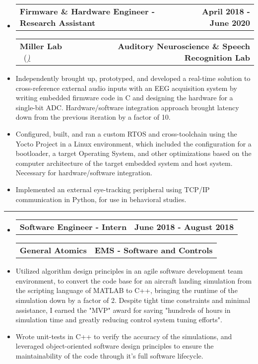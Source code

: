 \documentclass[10pt,letterpaper]{article}
\makeatletter
\newcommand{\header}[2]
{
	\begin{tabular*}{\linewidth}{l @{\extracolsep{\fill}} r}
		\hspace{-27pt} #1 & #2 \\
	\end{tabular*}
}
\makeatother
\begin{document}
\begin{itemize}
	\item[]
		\header
			{\textbf{Firmware \& Hardware Engineer - Research Assistant}} 
			{\textbf{April 2018 - June 2020}}
		\header
		{\textbf{Miller Lab} \ (\href{https://millerlab.faculty.ucdavis.edu}{\small \emph{\underline{\smash{millerlab.faculty.ucdavis.edu})}}} }
			{\textbf{Auditory Neuroscience \& Speech Recognition Lab}} 
		\item
			Independently brought up, prototyped, and developed a real-time solution to cross-reference external audio inputs with an EEG acquisition system by writing embedded firmware code in C and designing the hardware for a single-bit ADC. Hardware/software integration approach brought latency down from the previous iteration by a factor of 10.
		\item 
			Configured, built, and ran a custom RTOS and cross-toolchain using the Yocto Project in a Linux environment, which included the configuration for a bootloader, a target Operating System, and other optimizations based on the computer architecture of the target embedded system and host system. Necessary for hardware/software integration.
		\item 
			Implemented an external eye-tracking peripheral using TCP/IP communication in Python, for use in behavioral studies.
\end{itemize}

\hrule

\begin{itemize}
	\item[]
		\header
			{\textbf{Software Engineer - Intern}} 
			{\textbf{June 2018 - August 2018}}
		\header
			{\textbf{General Atomics}}
			{\textbf{EMS - Software and Controls}} 
		\item
			Utilized algorithm design principles in an agile software development team environment, to convert the code base for an aircraft landing simulation from the scripting language of MATLAB to C++, bringing the runtime of the simulation down by a factor of 2. Despite tight time constraints and minimal assistance, I earned the "MVP" award for saving "hundreds of hours in simulation time and greatly reducing control system tuning efforts".
		\item
			Wrote unit-tests in C++ to verify the accuracy of the simulations, and leveraged object-oriented software design principles to ensure the maintainability of the code through it's full software lifecycle.


\end{itemize}
\end{document}
